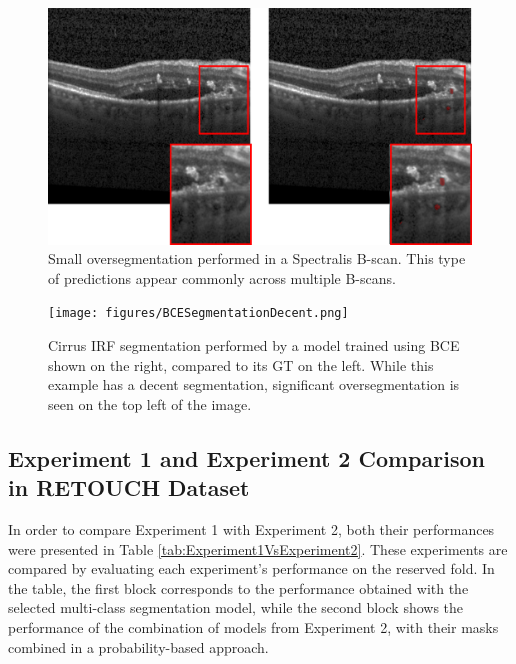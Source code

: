 \begin{figure}[!ht]
	\centering
	\includegraphics[width=0.8\linewidth]{figures/BCESegmentationError.png}
	\caption{Small oversegmentation performed in a Spectralis B-scan. This type of predictions appear commonly across multiple B-scans.}
	\label{fig:BCESegmentationError}
\end{figure}

\begin{figure}[!ht]
	\centering
	\texttt{[image: figures/BCESegmentationDecent.png]}
	\caption{Cirrus IRF segmentation performed by a model trained using BCE shown on the right, compared to its GT on the left. While this example has a decent segmentation, significant oversegmentation is seen on the top left of the image.}
	\label{fig:BCESegmentationDecent}
\end{figure}

\subsection{Experiment 1 and Experiment 2 Comparison in RETOUCH Dataset}

In order to compare Experiment 1 with Experiment 2, both their performances were presented in Table \ref{tab:Experiment1VsExperiment2}. These experiments are compared by evaluating each experiment's performance on the reserved fold. In the table, the first block corresponds to the performance obtained with the selected multi-class segmentation model, while the second block shows the performance of the combination of models from Experiment 2, with their masks combined in a probability-based approach.

